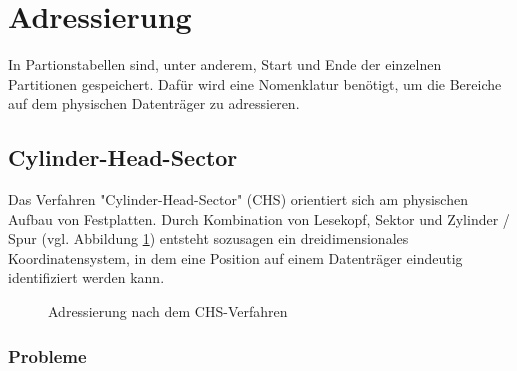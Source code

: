 \section{Adressierung}
In Partionstabellen sind, unter anderem, Start und Ende der einzelnen Partitionen gespeichert.
Dafür wird eine Nomenklatur benötigt, um die Bereiche auf dem physischen Datenträger zu adressieren.

\subsection{Cylinder-Head-Sector}
Das Verfahren "Cylinder-Head-Sector" (CHS) orientiert sich am physischen Aufbau von Festplatten.
Durch Kombination von Lesekopf, Sektor und Zylinder / Spur (vgl. Abbildung \ref{fig:chs}) entsteht sozusagen ein dreidimensionales Koordinatensystem, in dem eine Position auf einem Datenträger eindeutig identifiziert werden kann.

\begin{figure}[ht]
    \centering
    \fbox{}
    \caption{Adressierung nach dem CHS-Verfahren}
    \label{fig:chs}
\end{figure}

\subsubsection{Probleme}

